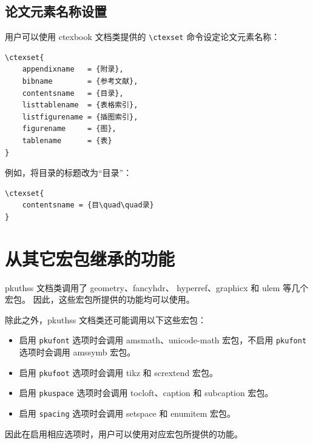 \subsection{论文元素名称设置}
用户可以使用 ctexbook 文档类提供的 \verb|\ctexset| 命令设定论文元素名称：
\begin{Verbatim}
\ctexset{
    appendixname   = {附录},
    bibname        = {参考文献},
    contentsname   = {目录},
    listtablename  = {表格索引},
    listfigurename = {插图索引},
    figurename     = {图},
    tablename      = {表}
}
\end{Verbatim}
例如，将目录的标题改为“目{\quad\quad}录”：
\begin{Verbatim}
\ctexset{
    contentsname = {目\quad\quad录}
}
\end{Verbatim}

\section{从其它宏包继承的功能}
\label{sec:thirdparty}

pkuthss 文档类调用了 geometry\cite{geometry}、fancyhdr\cite{fancyhdr}、%
hyperref\cite{hyperref}、graphicx\cite{graphicx}
和 ulem\cite{ulem} 等几个宏包。
因此，这些宏包所提供的功能均可以使用。

除此之外，pkuthss 文档类还可能调用以下这些宏包：
\begin{itemize}
    \item 启用 \verb|pkufont| 选项时会调用 amsmath、unicode-math
        \cite{unicode-math} 宏包，不启用
        \verb|pkufont| 选项时会调用 amssymb\cite{amssymb} 宏包。
    \item 启用 \verb|pkufoot| 选项时会调用
        tikz\cite{tikz} 和 scrextend\cite{scrextend} 宏包。
    \item 启用 \verb|pkuspace| 选项时会调用
        tocloft\cite{tocloft}、caption\cite{caption} 和
        subcaption\cite{subcaption} 宏包。
    \item 启用 \verb|spacing| 选项时会调用 setspace 和
        enumitem\cite{enumitem} 宏包。
\end{itemize}
因此在启用相应选项时，用户可以使用对应宏包所提供的功能。
